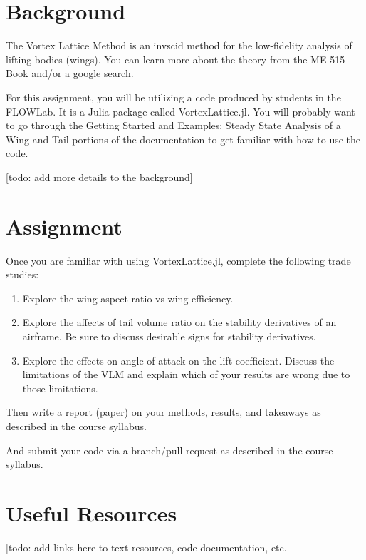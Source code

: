 \documentclass[12pt]{article}
\begin{document}
	
\section{Background}

	The Vortex Lattice Method is an invscid method for the low-fidelity analysis of lifting bodies (wings).
	You can learn more about the theory from the ME 515 Book and/or a google search.
	
	For this assignment, you will be utilizing a code produced by students in the FLOWLab.
	It is a Julia package called VortexLattice.jl.
	You will probably want to go through the Getting Started and Examples: Steady State Analysis of a Wing and Tail portions of the documentation to get familiar with how to use the code.
	
	[todo: add more details to the background]
	
\section{Assignment}
	Once you are familiar with using VortexLattice.jl, complete the following trade studies:
	
	\begin{enumerate}
		\item Explore the wing aspect ratio vs wing efficiency. 
		\item Explore the affects of tail volume ratio on the stability derivatives of an airframe. Be sure to discuss desirable signs for stability derivatives.
		\item Explore the effects on angle of attack on the lift coefficient. Discuss the limitations of the VLM and explain which of your results are wrong due to those limitations.
	\end{enumerate}


\noindent Then write a report (paper) on your methods, results, and takeaways as described in the course syllabus.

\bigskip

\noindent And submit your code via a branch/pull request as described in the course syllabus.

\section{Useful Resources}

[todo: add links here to text resources, code documentation, etc.]
	
\end{document}
